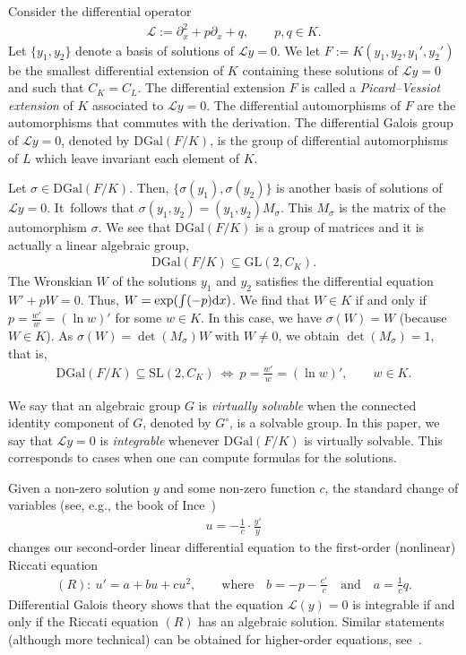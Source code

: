 \documentclass[10pt,a4paper]{amsart}
\numberwithin{equation}{section}
\begin{document}
Consider the differential operator
\begin{gather*}%
\mathcal L:=\partial_x^2 +p \partial_x +q,\qquad p,q\in K.
\end{gather*}
Let $\{ y_1,y_2\}$ denote a basis of solutions of $\mathcal Ly=0$.
We let $F:=K(y_1,y_2,y_1',y_2')$ be the smallest differential extension of $K$
containing these solutions of $\mathcal Ly=0$ and such that $C_K=C_L$.
The differential extension $F$ is called a \emph{Picard--Vessiot extension} of $K$ associated to $\mathcal Ly=0$.
The differential automorphisms of $F$ are the automorphisms that commutes with the derivation. The differential Galois group of $\mathcal Ly=0$, denoted by $\mathrm{DGal}(F/K)$, is the group of differential automorphisms of $L$ which leave invariant each element of $K$.

Let $\sigma\in \mathrm{DGal}(F/K)$. Then, $\{\sigma(y_1),\sigma(y_2)\}$ is another basis of solutions of $\mathcal Ly=0$. It~follows that
$\sigma (y_1, y_2)=(y_1,y_2)M_\sigma$. This $M_\sigma$ is the matrix of the automorphism $\sigma$.
We see that $\mathrm{DGal}(F/K)$ is a group of matrices and it is actually a linear algebraic group,
\begin{gather*}
\mathrm{DGal}(F/K) 	\subseteq \mathrm{GL}(2, C_K).
\end{gather*}
The Wronskian $W$ of the solutions $y_1$ and $y_2$
satisfies the differential equation $W'+pW=0$. Thus, $W=\exp(\int (-p){\rm d}x)$. We find that $W\in K$ if and only if $p=\frac{w'}{w}=(\ln w)'$ for some $w\in K$. In this case, we have $\sigma (W)=W$ (because $W\in K$).
As $\sigma (W)=\det(M_\sigma)W$ with $W\neq 0$, we obtain $\det(M_\sigma)=1$, that is,
\begin{gather*}
\mathrm{DGal}(F/K)\subseteq \mathrm{SL}(2, C_K) \
\Longleftrightarrow \ p=\frac{w'}{w } = (\ln w)', \qquad w\in K.
\end{gather*}

We say that an algebraic group $G$ is \emph{virtually solvable} when the connected identity component of $G$, denoted by $G^\circ$, is a solvable group. In this paper, we say that $\mathcal Ly=0$ is \emph{integrable} whenever $\mathrm{DGal}(F/K)$ is virtually solvable. This corresponds to cases when one can compute formulas for the solutions.

Given a non-zero solution $y$ and some non-zero function $c$, the standard change of variables (see, e.g., the book of Ince~\cite{in})
\begin{gather*}
u=-\frac1{c} \cdot \frac{y'}{y}
\end{gather*}
changes our second-order linear differential equation to the first-order (nonlinear) Riccati equation
\begin{gather*}
(R)\colon \ u'=a+bu+cu^2, \qquad \textrm{where}\quad b = -p - \frac{c'}{c}\quad \textrm{and}\quad a=\frac1{c} q.
\end{gather*}
Differential Galois theory shows that the equation $\mathcal{L}(y)=0$ is integrable if and only if the Riccati equation $(R)$ has an algebraic solution. Similar statements (although more technical) can be obtained for higher-order equations, see~\cite{PS}.
\end{document}
